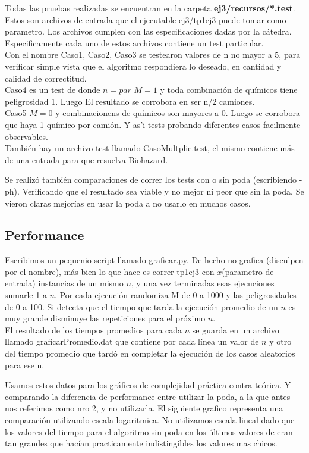 \noindent 
Todas las pruebas realizadas se encuentran en la carpeta \textbf{ej3/recursos/*.test}.\\
Estos son archivos de entrada que el ejecutable ej3/tp1ej3 puede tomar como parametro. Los archivos cumplen con las especificaciones dadas por la c\'atedra. Especificamente cada uno de estos archivos contiene un test particular. \\
Con el nombre Caso1, Caso2, Caso3 se testearon valores de n no mayor a 5, para verificar simple vista que el algoritmo respondiera lo deseado, en cantidad y calidad de correctitud. \\
Caso4 es un test de donde $n=par$ $M=1$ y toda combinaci\'on de qu\'imicos tiene peligrosidad 1. Luego El resultado se corrobora en ser n/2 camiones. \\
Caso5 $M=0$ y combinacionens de qu\'imicos son mayores a 0. Luego se corrobora que haya 1 qu\'imico por cami\'on.
Y as'i tests probando diferentes casos facilmente observables. \\
Tambi\'en hay un archivo test llamado CasoMultplie.test, el mismo contiene m\'as de una entrada para que resuelva Biohazard. 

\noindent 
Se realiz\'o tambi\'en comparaciones de correr los tests con o sin poda (escribiendo -ph). Verificando que el resultado sea viable y no mejor ni peor que sin la poda. Se vieron claras mejor\'ias en usar la poda a no usarlo en muchos casos. 


\subsection{Performance}

\noindent 
Escribimos un pequenio script llamado graficar.py. De hecho no grafica (disculpen por el nombre), m\'as bien lo que hace es correr tp1ej3 con $x$(parametro de entrada) instancias de un mismo $n$, y una vez terminadas esas ejecuciones sumarle 1 a $n$. Por cada ejecuci\'on randomiza M de 0 a 1000 y las peligrosidades de 0 a 100. Si detecta que el tiempo que tarda la ejecuci\'on promedio de un $n$ es muy grande disminuye las repeticiones para el pr\'oximo $n$. \\
El resultado de los tiempos promedios para cada $n$ se guarda en un archivo llamado graficarPromedio.dat que contiene por cada l\'inea un valor de $n$ y otro del tiempo promedio que tard\'o en completar la ejecuci\'on de los casos aleatorios para ese n.

\noindent 
Usamos estos datos para los gr\'aficos de complejidad pr\'actica contra te\'orica. Y comparando la diferencia de performance entre utilizar la poda, a la que antes nos referimos como nro 2, y no utilizarla.
El siguiente grafico representa una comparación utilizando escala logaritmica. No utilizamos escala lineal dado que los valores del tiempo para el algoritmo sin poda en los \'ultimos valores de eran tan grandes que hacían practicamente indistingibles los valores mas chicos.

